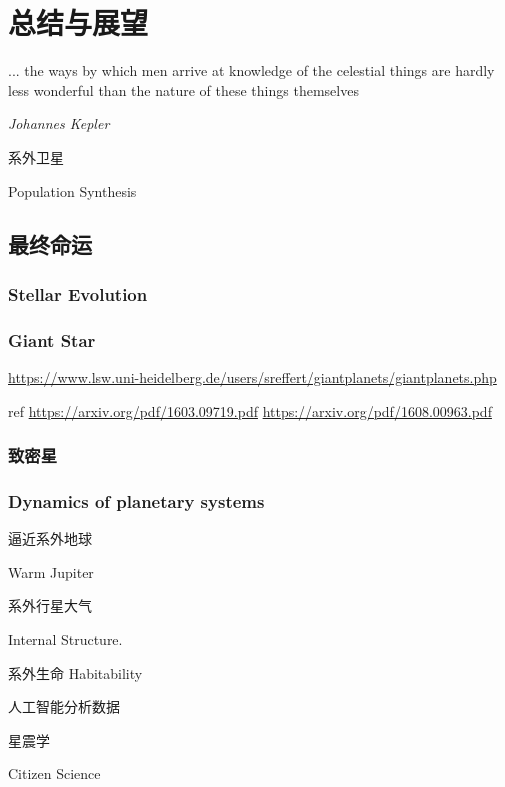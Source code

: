 \chapter{总结与展望} \label{chapter:conclusion}

\epigraph{... the ways by which men arrive at knowledge of the celestial things are hardly less wonderful than the nature of these things themselves}{\textit{Johannes Kepler}}

系外卫星

Population Synthesis

\section{最终命运} \label{sec:fateofplanets}

\subsection{Stellar Evolution} 

\subsection{Giant Star}  \label{sec:hjofgiants}

\url{https://www.lsw.uni-heidelberg.de/users/sreffert/giantplanets/giantplanets.php}

ref
\url{https://arxiv.org/pdf/1603.09719.pdf}
\url{https://arxiv.org/pdf/1608.00963.pdf}


\subsection{致密星}

\subsection{Dynamics of planetary systems}



逼近系外地球

Warm Jupiter

系外行星大气

Internal Structure.

系外生命 Habitability

人工智能分析数据

星震学

Citizen Science

